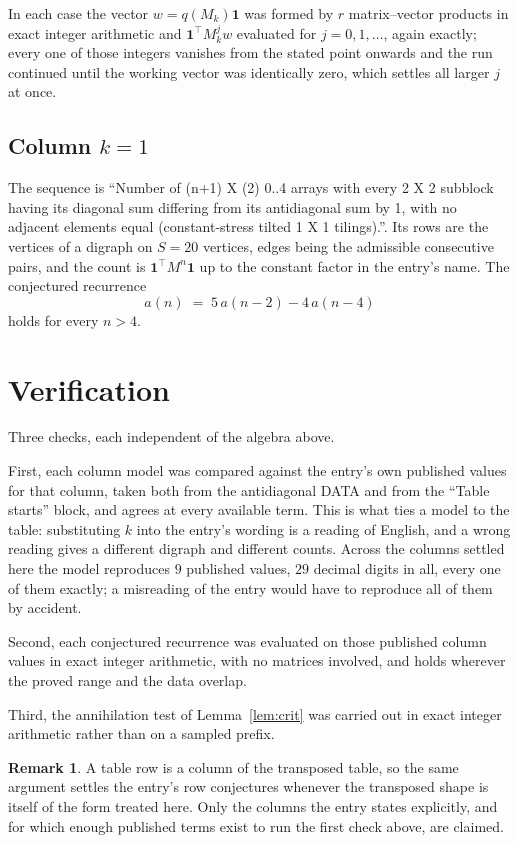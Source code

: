 \documentclass[11pt,a4paper]{article}
\theoremstyle{plain}
\theoremstyle{definition}
\newtheorem{remark}[theorem]{Remark}
\begin{document}
In each case the vector $w=q(M_k)\mathbf{1}$ was formed by $r$ matrix--vector products in
exact integer arithmetic and $\mathbf{1}^{\!\top}M_k^{j}w$ evaluated for $j=0,1,\dots$,
again exactly; every one of those integers vanishes from the stated point onwards and the run
continued until the working vector was identically zero, which settles all larger $j$ at once.

\subsection*{Column $k=1$}
The sequence is ``Number of (n+1) X (2) 0..4 arrays with every 2 X 2 subblock having its diagonal sum differing from its antidiagonal sum by 1, with no adjacent elements equal (constant-stress tilted 1 X 1 tilings).''. Its rows are the vertices of a digraph on
$S=20$ vertices, edges being the admissible consecutive pairs, and the count is
$\mathbf{1}^{\!\top}M^{n}\mathbf{1}$ up to the constant factor in the entry's name.
The conjectured recurrence
\[
a(n)\;=\;5\,a(n-2) - 4\,a(n-4)
\]
holds for every $n>4$.

\section{Verification}

Three checks, each independent of the algebra above.

First, each column model was compared against the entry's own published values for that
column, taken both from the antidiagonal DATA and from the ``Table starts'' block, and agrees
at every available term. This is what ties a model to the table: substituting $k$ into the
entry's wording is a reading of English, and a wrong reading gives a different digraph and
different counts. Across the columns settled here the model reproduces $9$ published
values, $29$ decimal digits in all, every one of them exactly; a misreading of the entry
would have to reproduce all of them by accident.

Second, each conjectured recurrence was evaluated on those published column values in exact
integer arithmetic, with no matrices involved, and holds wherever the proved range and the
data overlap.

Third, the annihilation test of Lemma~\ref{lem:crit} was carried out in exact integer
arithmetic rather than on a sampled prefix.

\begin{remark}
A table row is a column of the transposed table, so the same argument settles the entry's row
conjectures whenever the transposed shape is itself of the form treated here. Only the columns
the entry states explicitly, and for which enough published terms exist to run the first check
above, are claimed.
\end{remark}
\end{document}
